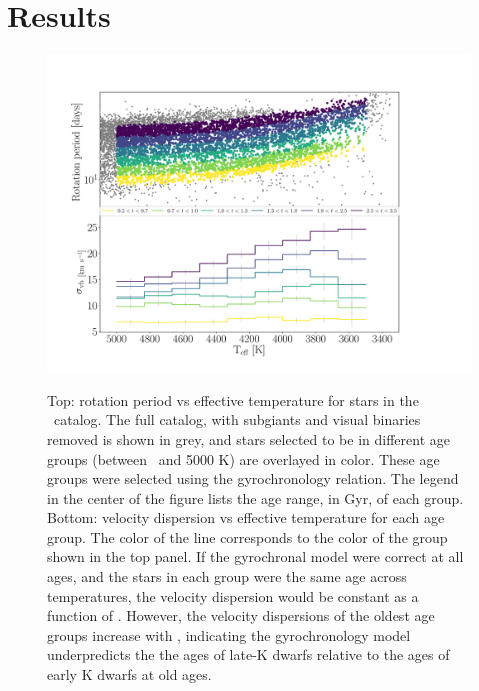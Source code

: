 \section{Results}
\label{sec:results}

\begin{figure}
  \caption{
Top: rotation period vs effective temperature for stars in the \mct\
    catalog.
    The full catalog, with subgiants and visual binaries removed is shown in
    grey, and stars selected to be in different age groups (between \tmin\ and
    5000 K) are overlayed in color.
These age groups were selected using the \citet{angus2019} gyrochronology
    relation.
The legend in the center of the figure lists the age range, in Gyr, of each
    group.
Bottom: velocity dispersion vs effective temperature for each age
    group.
The color of the line corresponds to the color of the group shown in the top
    panel.
If the gyrochronal model were correct at all ages, and the stars in each group
    were the same age across temperatures, the velocity dispersion would be
    constant as a function of \teff.
However, the velocity dispersions of the oldest age groups increase with
    \teff, indicating the \citet{angus2019} gyrochronology model underpredicts
    the the ages of late-K dwarfs relative to the ages of early K dwarfs at
    old ages.
}
  \centering
    \includegraphics[width=1\textwidth]{age_cut}
\label{fig:age_cut}
\end{figure}
